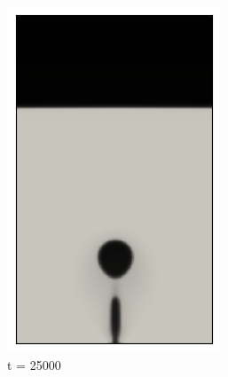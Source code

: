\begin{figure}[H]
	\medskip
	\begin{subfigure}{0.25\textwidth}
		\includegraphics[width=\linewidth]{figs/cap4/bb_760_d25}
		\caption{t = 25000}
		\label{fig:4}
	\end{subfigure}\hfil  
	\begin{subfigure}{0.25\textwidth}

\end{subfigure}
\end{figure}
